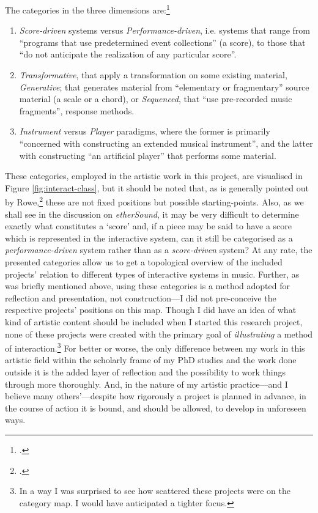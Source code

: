The categories in the three dimensions are:\footcite[These categories are clearly outlined in][and all the citations below are taken from p.7--8]{rowe} 

\begin{enumerate}
\item \emph{Score-driven} systems versus \emph{Performance-driven}, i.e.  systems that range from ``programs that use predetermined event collections'' (a score), to those that ``do not anticipate the realization of any particular score''.

\item \emph{Transformative}, that apply a transformation on some existing material, \emph{Generative}; that generates material from ``elementary or fragmentary'' source material (a scale or a chord), or \emph{Sequenced}, that ``use pre-recorded music fragments'', response methods.

\item \emph{Instrument} versus \emph{Player} paradigms, where the former is primarily ``concerned with constructing an extended musical instrument'', and the latter with constructing ``an artificial player'' that performs some material.
\end{enumerate}

These categories, employed in the artistic work in this project, are visualised in Figure \ref{fig:interact-class}, but it should be noted that, as is generally pointed out by Rowe,\footcite[6]{rowe} these are not fixed positions but possible starting-points. Also, as we shall see in the discussion on \emph{etherSound}, it may be very difficult to determine exactly what constitutes a `score' and, if a piece may be said to have a score which is represented in the interactive system, can it still be categorised as a \emph{performance-driven} system rather than as a \emph{score-driven} system? At any rate, the presented categories allow us to get a topological overview of the included projects' relation to different types of interactive systems in music. Further, as was briefly mentioned above, using these categories is a method adopted for reflection and presentation, not construction---I did not pre-conceive the respective projects' positions on this map. Though I did have an idea of what kind of artistic content should be included when I started this research project, none of these projects were created with the primary goal of \emph{illustrating} a method of interaction.\footnote{In a way I was surprised to see how scattered these projects were on the category map. I would have anticipated a tighter focus.} For better or worse, the only difference between my work in this artistic field within the scholarly frame of my PhD studies and the work done outside it is the added layer of reflection and the possibility to work things through more thoroughly. And, in the nature of my artistic practice---and I believe many others'---despite how rigorously a project is planned in advance, in the course of action it is bound, and should be allowed, to develop in unforeseen ways.

